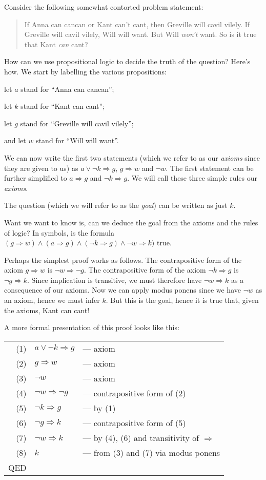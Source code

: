 \documentclass[a4paper,11pt,notitlepage,onecolumn]{article}
\newcommand{\Not}[1]%
{\neg{}#1}
\newcommand{\Conj}%
{\wedge}
\newcommand{\Disj}%
{\vee}
\newcommand{\Imp}%
{\Rightarrow}
\begin{document}
Consider the following somewhat contorted problem statement:
\begin{quote}
If Anna can cancan or Kant can't cant, then Greville will cavil vilely.
If Greville will cavil vilely, Will will want.  But
Will \emph{won't} want.  So is it true that Kant \emph{can} cant?
\end{quote}
How can we use propositional logic to decide the truth of the question?
Here's how.  We start by labelling the various propositions:
\begin{description}
\item let $a$ stand for ``Anna can cancan'';
\item let $k$ stand for ``Kant can cant'';
\item let $g$ stand for ``Greville will cavil vilely'';
\item and let $w$ stand for ``Will will want''.
\end{description}
We can now write the first two statements (which we refer to as our
\emph{axioms} since they are given to us) as $a \Disj \Not{k} \Imp g$,
$g \Imp w$ and $\Not{w}$.  The first statement can be further simplified to
$a \Imp g$ and $\Not{k} \Imp g$.  We will call these three simple rules our
\emph{axioms}.

The question (which we will refer to as the \emph{goal}) can be written
as just $k$.

Want we want to know is, can we deduce the goal from the axioms and the
rules of logic?  In symbols, is the formula
$(g \Imp w) \Conj (a \Imp g) \Conj (\Not{k} \Imp g) \Conj \Not{w} \Imp k)$
true.

Perhaps the simplest proof works as follows.  The contrapositive form of
the axiom $g \Imp w$ is $\Not{w} \Imp \Not{g}$.  The contrapositive form
of the axiom $\Not{k} \Imp g$ is $\Not{g} \Imp k$.  Since implication is
transitive, we must therefore have $\Not{w} \Imp k$ as a consequence of
our axioms.  Now we can apply modus ponens since we have $\Not{w}$ as an
axiom, hence we must infer $k$.  But this is the goal, hence it is true
that, given the axioms, Kant can cant!

A more formal presentation of this proof looks like this:\\
\begin{tabular}{rll}
(1) & $a \Disj \Not{k} \Imp g$ & --- axiom \\
(2) & $g \Imp w$ & --- axiom \\
(3) & $\Not{w}$ & --- axiom \\
(4) & $\Not{w} \Imp \Not{g}$ & --- contrapositive form of (2) \\
(5) & $\Not{k} \Imp g$ & --- by (1) \\
(6) & $\Not{g} \Imp k$ & --- contrapositive form of (5) \\
(7) & $\Not{w} \Imp k$ & --- by (4), (6) and transitivity of $\Imp$ \\
(8) & $k$ & --- from (3) and (7) via modus ponens \\
QED \\
\end{tabular}
\end{document}
